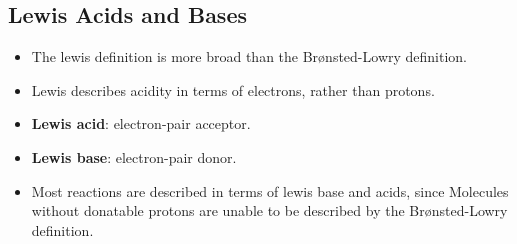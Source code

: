 \documentclass[12pt,a4paper]{article}
\begin{document}
\subsection{Lewis Acids and Bases}
\begin{itemize}
    \item The lewis definition is more broad than the Br{\o}nsted-Lowry definition.
    \item Lewis describes acidity in terms of {\color{o-Sun}electrons}, rather than protons.
    \item \textbf{Lewis acid}: electron-pair {\color{o-Sun}acceptor}.
    \item \textbf{Lewis base}: electron-pair {\color{o-Sun}donor}.
    \item Most reactions are described in terms of lewis base and acids, since Molecules without donatable protons are unable to be described by the Br{\o}nsted-Lowry definition.
\end{itemize}
\end{document}
